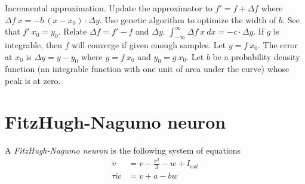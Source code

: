 Incremental approximation.
Update the approximator to \(f' = f + \Delta f\)
where
\(\Delta f~x = - b ~ (x - x_0) \cdot \Delta y\).
Use genetic algorithm to optimize the width of \(b\).
See that \(f'~x_0 = y_0\).
Relate \(\Delta f = f' - f\) and \(\Delta y\).
\(\int_{-\infty}^\infty \Delta f~x ~ dx = - c \cdot \Delta y\).
If \(g\) is integrable, then \(f\) will converge if given enough samples.
Let \(y = f~x_0\).
The error at \(x_0\) is \(\Delta y = y - y_0\)
where \(y = f~x_0\) and \(y_0 = g~x_0\).
Let \(b\) be a probability density function (an integrable function with one unit of area under the curve) whose peak is at zero.



\section{FitzHugh-Nagumo neuron}

%
%
A \emph{FitzHugh-Nagumo neuron} is the following system of equations \cite{izhikevich2006fhn}
\begin{align*}
    \dot v &= v - \frac{v^3}{3} - w + I_{ext}
    \\
    \tau \dot w &= v + a - b w
\end{align*}
